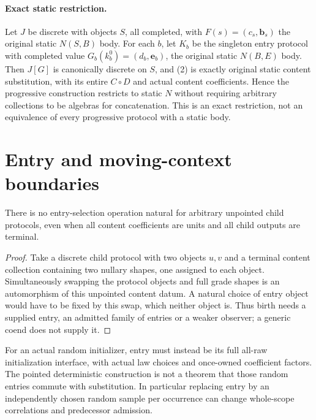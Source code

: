 \documentclass[11pt]{article}
\begin{document}
\paragraph{Exact static restriction.}
Let $J$ be discrete with objects $S$, all completed, with $F(s)=(c_s,\mathbf b_s)$ the original static $N(S,B)$ body. For each $b$, let $K_b$ be the singleton entry protocol with completed value $G_b(k_b^0)=(d_b,\mathbf e_b)$, the original static $N(B,E)$ body. Then $J[G]$ is canonically discrete on $S$, and (2) is exactly original static content substitution, with its entire $C\circ D$ and actual content coefficients. Hence the progressive construction restricts to static $N$ without requiring arbitrary collections to be algebras for concatenation. This is an exact restriction, not an equivalence of every progressive protocol with a static body.

\section{Entry and moving-context boundaries}
\begin{proposition}
There is no entry-selection operation natural for arbitrary unpointed child protocols, even when all content coefficients are units and all child outputs are terminal.
\end{proposition}
\begin{proof}
Take a discrete child protocol with two objects $u,v$ and a terminal content collection containing two nullary shapes, one assigned to each object. Simultaneously swapping the protocol objects and full grade shapes is an automorphism of this unpointed content datum. A natural choice of entry object would have to be fixed by this swap, which neither object is. Thus birth needs a supplied entry, an admitted family of entries or a weaker observer; a generic coend does not supply it.\end{proof}

For an actual random initializer, entry must instead be its full all-raw initialization interface, with actual law choices and once-owned coefficient factors. The pointed deterministic construction is not a theorem that those random entries commute with substitution. In particular replacing entry by an independently chosen random sample per occurrence can change whole-scope correlations and predecessor admission.
\end{document}
